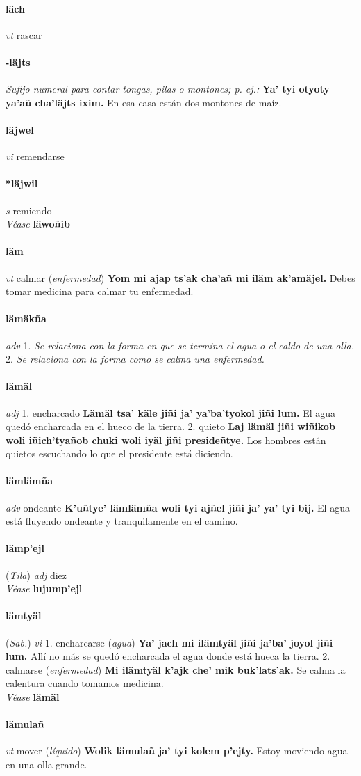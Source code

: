 \documentclass{scrbook}
\newcommand{\entry}[1]{\paragraph{#1}}
\newcommand{\onedefinition}[1]{#1.}
\newcommand{\nontranslationdef}[1]{\textit{#1}}
\newcommand{\partofspeech}[1]{\textit{#1}}
\newcommand{\spanishtranslation}[1]{#1}
\newcommand{\clarification}[1]{(\textit{#1})}
\newcommand{\cholexample}[1]{\textbf{#1}}
\newcommand{\exampletranslation}[1]{#1}
\newcommand{\alsosee}[1]{\\\textit{Véase} \textbf{#1}}
\newcommand{\relevantdialect}[1]{(\textit{#1})}
\begin{document}
\begin{multicols}{2}
\entry{läch}
\partofspeech{vt}
\spanishtranslation{rascar}

\entry{-läjts}
\nontranslationdef{Sufijo numeral para contar tongas, pilas o montones; p. ej.:}
\cholexample{Ya' tyi otyoty ya'añ cha'läjts ixim.}
\exampletranslation{En esa casa están dos montones de maíz.}

\entry{läjwel}
\partofspeech{vi}
\spanishtranslation{remendarse}

\entry{*läjwil}
\partofspeech{s}
\spanishtranslation{remiendo}
\alsosee{läwoñib}

\entry{läm}
\partofspeech{vt}
\spanishtranslation{calmar}
\clarification{enfermedad}
\cholexample{Yom mi ajap ts'ak cha'añ mi iläm ak'amäjel.}
\exampletranslation{Debes tomar medicina para calmar tu enfermedad.}

\entry{lämäkña}
\partofspeech{adv}
\onedefinition{1}
\nontranslationdef{Se relaciona con la forma en que se termina el agua o el caldo de una olla.}
\onedefinition{2}
\nontranslationdef{Se relaciona con la forma como se calma una enfermedad.}

\entry{lämäl}
\partofspeech{adj}
\onedefinition{1}
\spanishtranslation{encharcado}
\cholexample{Lämäl tsa' käle jiñi ja' ya'ba'tyokol jiñi lum.}
\exampletranslation{El agua quedó encharcada en el hueco de la tierra.}
\onedefinition{2}
\spanishtranslation{quieto}
\cholexample{Laj lämäl jiñi wiñikob woli iñich'tyañob chuki woli iyäl jiñi presideñtye.}
\exampletranslation{Los hombres están quietos escuchando lo que el presidente está diciendo.}

\entry{lämlämña}
\partofspeech{adv}
\spanishtranslation{ondeante}
\cholexample{K'uñtye' lämlämña woli tyi ajñel jiñi ja' ya' tyi bij.}
\exampletranslation{El agua está fluyendo ondeante y tranquilamente en el camino.}

\entry{lämp'ejl}
\relevantdialect{Tila}
\partofspeech{adj}
\spanishtranslation{diez}
\alsosee{lujump'ejl}

\entry{lämtyäl}
\relevantdialect{Sab.}
\partofspeech{vi}
\onedefinition{1}
\spanishtranslation{encharcarse}
\clarification{agua}
\cholexample{Ya' jach mi ilämtyäl jiñi ja'ba' joyol jiñi lum.}
\exampletranslation{Allí no más se quedó encharcada el agua donde está hueca la tierra.}
\onedefinition{2}
\spanishtranslation{calmarse}
\clarification{enfermedad}
\cholexample{Mi ilämtyäl k'ajk che' mik buk'lats'ak.}
\exampletranslation{Se calma la calentura cuando tomamos medicina.}
\alsosee{lämäl}

\entry{lämulañ}
\partofspeech{vt}
\spanishtranslation{mover}
\clarification{líquido}
\cholexample{Wolik lämulañ ja' tyi kolem p'ejty.}
\exampletranslation{Estoy moviendo agua en una olla grande.}


\end{multicols}
\end{document}

